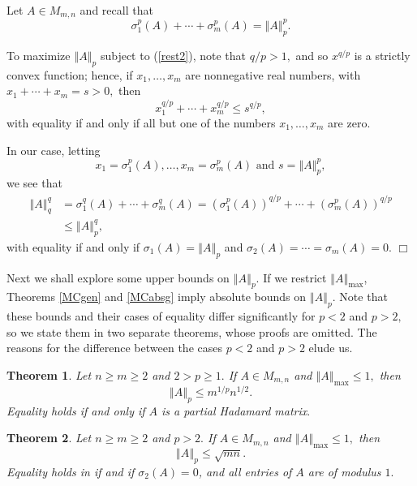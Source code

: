 \documentclass[12pt]{article}%
\newtheorem{theorem}{Theorem}[section]
\newenvironment{proof}[1][Proof]{\noindent{\textbf {#1}  }}  {\hfill$\Box$\bigskip}
\begin{document}
\begin{proof}
Let $A\in M_{m,n}$ and recall that
\begin{equation}
\sigma_{1}^{p}\left(  A\right)  +\cdots+\sigma_{m}^{p}\left(  A\right)
=\left\Vert A\right\Vert _{p}^{p}. \label{rest2}%
\end{equation}


To maximize $\left\Vert A\right\Vert _{p}$ subject to (\ref{rest2}), note that
$q/p>1,$ and so $x^{q/p}$ is a strictly convex function; hence, if
$x_{1},\ldots,x_{m}$ are nonnegative real numbers, with $x_{1}+\cdots
+x_{m}=s>0,$ then
\[
x_{1}^{q/p}+\cdots+x_{m}^{q/p}\leq s^{q/p},
\]
with equality if and only if all but one of the numbers $x_{1},\ldots,x_{m}$
are zero.

In our case, letting
\[
x_{1}=\sigma_{1}^{p}\left(  A\right)  ,\ldots,x_{m}=\sigma_{m}^{p}\left(
A\right)  \text{ \ \ and \ \ }s=\left\Vert A\right\Vert _{p}^{p},
\]
we see that
\begin{align*}
\left\Vert A\right\Vert _{q}^{q}  &  =\sigma_{1}^{q}\left(  A\right)
+\cdots+\sigma_{m}^{q}\left(  A\right)  =\left(  \sigma_{1}^{p}\left(
A\right)  \right)  ^{q/p}+\cdots+\left(  \sigma_{m}^{p}\left(  A\right)
\right)  ^{q/p}\\
&  \leq\left\Vert A\right\Vert _{p}^{q},
\end{align*}
with equality if and only if $\sigma_{1}\left(  A\right)  =\left\Vert
A\right\Vert _{p}$ and $\sigma_{2}\left(  A\right)  =\cdots=\sigma_{m}\left(
A\right)  =0.$
\end{proof}

Next we shall explore some upper bounds on $\left\Vert A\right\Vert _{p}.$ If
we restrict $\left\Vert A\right\Vert _{\max}$, Theorems \ref{MCgen} and
\ref{MCabsg} imply absolute bounds on $\left\Vert A\right\Vert _{p}.$ Note
that these bounds and their cases of equality differ significantly for $p<2$
and $p>2,$ so we state them in two separate theorems, whose proofs are
omitted. The reasons for the difference between the cases $p<2$ and $p>2$
elude us.

\begin{theorem}
\label{MCabs}Let $n\geq m\geq2$ and $2>p\geq1.$ If $A\in M_{m,n}$ and
$\left\Vert A\right\Vert _{\max}\leq1,$ then
\[
\left\Vert A\right\Vert _{p}\leq m^{1/p}n^{1/2}.
\]
Equality holds if and only if $A$ is a partial Hadamard matrix$.$
\end{theorem}

\begin{theorem}
\label{MCabs1}Let $n\geq m\geq2$ and $p>2.$ If $A\in M_{m,n}$ and $\left\Vert
A\right\Vert _{\max}\leq1,$ then
\[
\left\Vert A\right\Vert _{p}\leq\sqrt{mn}.
\]
Equality holds in if and if $\sigma_{2}\left(  A\right)  =0$, and all entries
of $A$ are of modulus $1.$
\end{theorem}
\end{document}
